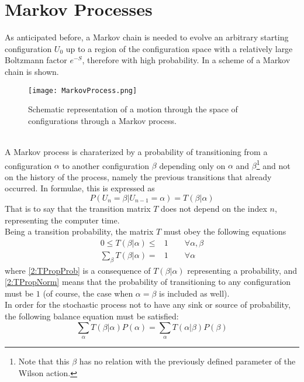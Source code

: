 \section{Markov Processes}
As anticipated before, a Markov chain is needed to evolve an arbitrary starting configuration $U_0$ up to a region of the configuration space with a relatively large Boltzmann factor $e^{-S}$, therefore with high probability.
In  a scheme of a Markov chain is shown.
\begin{figure}[!htbp]
    \centering
    \texttt{[image: MarkovProcess.png]}
    \caption{Schematic representation of a motion through the space of configurations through a Markov process.}
    \label{2F:MarkovProcess}
\end{figure}\\
A Markov process is charaterized by a probability of transitioning from a configuration $\alpha$ to another configuration $\beta$ depending only on $\alpha$ and $\beta$\footnote{Note that this $\beta$ has no relation with the previously defined parameter of the Wilson action.} and not on the history of the process, namely the previous transitions that already occurred.
In formulae, this is expressed as
\begin{equation}
    P(U_n=\beta|U_{n-1}=\alpha) = T(\beta|\alpha) \label{2:TransMatrix}
\end{equation}
That is to say that the transition matrix $T$ does not depend on the index $n$, representing the computer time.\\
Being a transition probability, the matrix $T$ must obey the following equations
\begin{align}
    0 \leq T(\beta|\alpha) \leq& 1 \qquad \forall \alpha,\beta \label{2:TPropProb} \\
    \sum_{\beta}T(\beta|\alpha) =& 1 \qquad \forall \alpha \label{2:TPropNorm}
\end{align}
where \eqref{2:TPropProb} is a consequence of $T(\beta|\alpha)$ representing a probability, and \eqref{2:TPropNorm} means that the probability of transitioning to any configuration must be $1$ (of course, the case when $\alpha=\beta$ is included as well).\\
In order for the stochastic process not to have any sink or source of probability, the following balance equation must be satisfied:
\begin{equation}
    \sum_\alpha T(\beta|\alpha)P(\alpha) = \sum_\alpha T(\alpha|\beta)P(\beta) \label{2:BalanceEq}
\end{equation}
